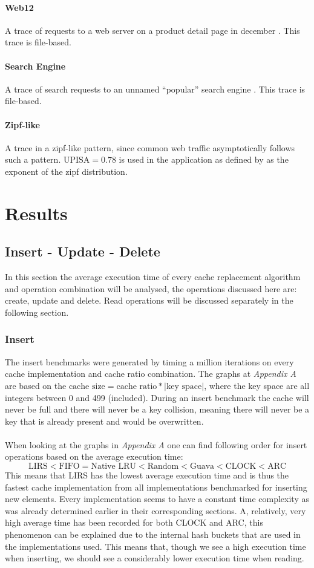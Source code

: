 \documentclass[pdftex,a4paper,12pt,twoside]{report}
\begin{document}
\paragraph{Web12} A trace of requests to a web server on a product detail page in december \citep{cache2k_web12}. This trace is file-based.
\paragraph{Search Engine} A trace of search requests to an unnamed ``popular'' search engine \citep{spc_umass_searchengine}. This trace is file-based.
\paragraph{Zipf-like} A trace in a zipf-like pattern, since common web traffic asymptotically follows such a pattern. $\text{UPISA} = 0.78$ is used in the application as defined by \cite{breslau1999web} as the exponent of the zipf distribution.
\section{Results}
\subsection{Insert - Update - Delete}
In this section the average execution time of every cache replacement algorithm and operation combination will be analysed, the operations discussed here are: create, update and delete. Read operations will be discussed separately in the following section.
\subsubsection{Insert}
The insert benchmarks were generated by timing a million iterations on every cache implementation and cache ratio combination. The graphs at \emph{Appendix A} are based on the $\text{cache size} = \text{cache ratio} * \left\vert{\text{key space}}\right\vert$, where the key space are all integers between 0 and 499 (included). During an insert benchmark the cache will never be full and there will never be a key collision, meaning there will never be a key that is already present and would be overwritten.
\\\\
When looking at the graphs in \emph{Appendix A} one can find following order for insert operations based on the average execution time:
\[
\text{LIRS} < \text{FIFO} = \text{Native LRU} < \text{Random} < \text{Guava} < \text{CLOCK} < \text{ARC}
\]
This means that LIRS has the lowest average execution time and is thus the fastest cache implementation from all implementations benchmarked for inserting new elements.
Every implementation seems to have a constant time complexity as was already determined earlier in their corresponding sections. A, relatively, very high average time has been recorded for both CLOCK and ARC, this phenomenon can be explained due to the internal hash buckets that are used in the implementations used. This means that, though we see a high execution time when inserting, we should see a considerably lower execution time when reading.
\end{document}
